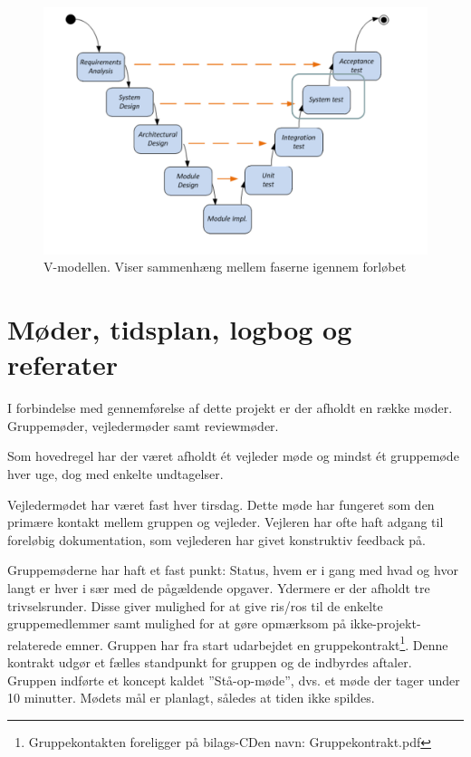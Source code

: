 \begin{figure}[h]
  \centering
    \includegraphics[width=\textwidth]{Billeder/V_modellen}
    \caption{V-modellen. Viser sammenhæng mellem faserne igennem forløbet}
    \label{fig:V_modellen}
\end{figure}

\section{Møder, tidsplan, logbog og referater}

I forbindelse med gennemførelse af dette projekt er der afholdt en række møder. Gruppemøder, vejledermøder samt reviewmøder. 

Som hovedregel har der været afholdt ét vejleder møde og mindst ét gruppemøde hver uge, dog med enkelte undtagelser. 

Vejledermødet har været fast hver tirsdag. Dette møde har fungeret som den primære kontakt mellem gruppen og vejleder. Vejleren har ofte haft adgang til foreløbig dokumentation, som vejlederen har givet konstruktiv feedback på.

Gruppemøderne har haft et fast punkt: Status, hvem er i gang med hvad og hvor langt er hver i sær med de pågældende opgaver. Ydermere er der afholdt tre trivselsrunder. Disse giver mulighed for at give ris/ros til de enkelte gruppemedlemmer samt mulighed for at gøre opmærksom på ikke-projekt-relaterede emner. 
Gruppen har fra start udarbejdet en gruppekontrakt\footnote{Gruppekontakten foreligger på bilags-CDen navn: Gruppekontrakt.pdf}. Denne kontrakt udgør et fælles standpunkt for gruppen og de indbyrdes aftaler. Gruppen indførte et koncept kaldet ''Stå-op-møde'', dvs. et møde der tager under 10 minutter. Mødets mål er planlagt, således at tiden ikke spildes. 

